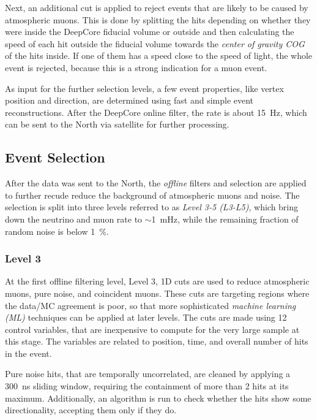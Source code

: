 Next, an additional cut is applied to reject events that are likely to be caused by atmospheric muons. This is done by splitting the hits depending on whether they were inside the DeepCore fiducial volume or outside and then calculating the speed of each hit outside the fiducial volume towards the \textit{center of gravity {COG}} of the hits inside. If one of them has a speed close to the speed of light, the whole event is rejected, because this is a strong indication for a muon event.

As input for the further selection levels, a few event properties, like vertex position and direction, are determined using fast and simple event reconstructions. After the DeepCore online filter, the rate is about \SI{15}{\hertz}, which can be sent to the North via satellite for further processing.


\subsection{Event Selection} 

After the data was sent to the North, the \textit{offline} filters and selection are applied to further recude reduce the background of atmospheric muons and noise. The selection is split into three levels referred to as \textit{Level 3-5 (L3-L5)}, which bring down the neutrino and muon rate to $\sim$\SI{1}{\milli\hertz}, while the remaining fraction of random noise is below \SI{1}{\percent}.


\subsubsection{Level 3} 

At the first offline filtering level, Level 3, 1D cuts are used to reduce atmospheric muons, pure noise, and coincident muons. These cuts are targeting regions where the data/MC agreement is poor, so that more sophisticated \textit{machine learning (ML)} techniques can be applied at later levels. The cuts are made using 12 control variables, that are inexpensive to compute for the very large sample at this stage. The variables are related to position, time, and overall number of hits in the event.

Pure noise hits, that are temporally uncorrelated, are cleaned by applying a \SI{300}{\nano\second} sliding window, requiring the containment of more than 2 hits at its maximum. Additionally, an algorithm is run to check whether the hits show some directionality, accepting them only if they do.

